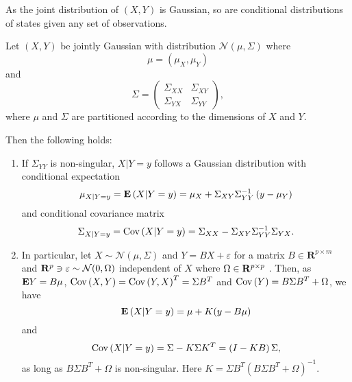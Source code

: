 As the joint distribution of $(X, Y)$ is Gaussian, so are conditional distributions of states given any set of observations.

\begin{lemma}
    \label{lem:gaussian_conditional}
    Let $(X,Y)$ be jointly Gaussian with distribution $\mathcal N \left( \mu, \Sigma \right)$ where 
    $$
    \mu = \left(\mu_{X}, \mu_{Y}\right)
    $$
    and 
    $$
    \Sigma = \begin{pmatrix}
        \Sigma_{XX} & \Sigma_{XY} \\
        \Sigma_{YX} & \Sigma_{YY}
    \end{pmatrix},
    $$
    where $\mu$ and $\Sigma$ are partitioned according to the dimensions of $X$ and $Y$. 
    
    Then the following holds:
    
    \begin{enumerate}
        \item If $\Sigma_{YY}$ is non-singular, $X|Y = y$ follows a Gaussian distribution with conditional expectation
            $$
            \mu_{X|Y = y} = \mathbf E \left( X | Y = y \right) = \mu_{X} + \Sigma_{XY}\Sigma_{YY}^{-1} \left( y - \mu_{Y} \right)
            $$
            and conditional covariance matrix 
            $$
            \Sigma_{X| Y =y} = \text{Cov} \left( X | Y = y \right) = \Sigma_{XX} - \Sigma_{XY} \Sigma_{YY}^{-1} \Sigma_{YX}.
            $$

        \item In particular, let $X\sim \mathcal N(\mu, \Sigma)$ and $Y = BX + \varepsilon$ for a matrix $B \in \mathbf R^{p\times m}$ and $\mathbf R^{p} \ni \varepsilon \sim \mathcal N(0, \Omega)$ independent of $X$ where $\Omega \in \mathbf R^{p\times p}$ . 
            Then, as 
            $\mathbf E Y = B \mu$, $\text{Cov} \left( X,Y \right) = \text{Cov} \left( Y, X \right)^{T}= \Sigma B^{T}$ and $\text{Cov} \left( Y \right) = B \Sigma B^{T} + \Omega$, we have
            $$
                \mathbf E \left( X | Y = y \right) = \mu + K (y - B \mu)
            $$
            and 
            $$
            \text{Cov} \left( X | Y = y \right) = \Sigma - K \Sigma K^{T} = \left( I  -  KB \right) \Sigma,
            $$
            as long as $B \Sigma B^{T} + \Omega$ is non-singular.
            Here $K = \Sigma B^{T} \left( B \Sigma B^{T} + \Omega \right)^{-1}$.


\end{enumerate}
\end{lemma}
